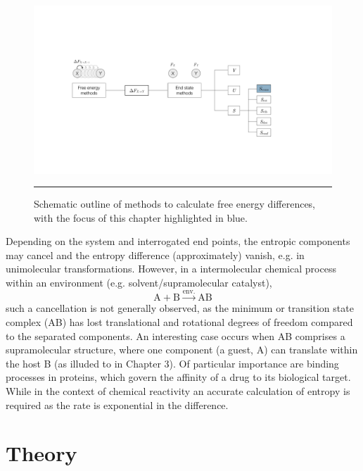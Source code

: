 \documentclass[../main.tex]{subfiles}
\begin{document}
\begin{figure}[h!]
	\centering
	\includegraphics[width=14.5cm]{4/figs/figXA_intro/figXA_intro}
	\vspace{0.4cm}
	\hrule
	\caption{Schematic outline of methods to calculate free energy differences, with the focus of this chapter highlighted in blue.}
	\label{fig::entropy_XA_intro}
\end{figure}


Depending on the system and interrogated end points, the entropic components may cancel and the entropy difference (approximately) vanish, e.g. in unimolecular transformations. However, in a intermolecular chemical process within an environment (e.g. solvent/supramolecular catalyst),
\begin{equation}
\text{A} + \text{B} \xrightarrow{\text{env.}} \text{AB}
\end{equation}
such a cancellation is not generally observed, as the minimum or transition state complex (AB) has lost translational and rotational degrees of freedom compared to the separated components.\cite{Jensen1999} An interesting case occurs when AB comprises a supramolecular structure, where one component (a guest, A) can translate within the host B (as illuded to in Chapter 3). Of particular importance are binding processes in proteins, which govern the affinity of a drug to its biological target.\cite{Woo2005} While in the context of chemical reactivity an accurate calculation of entropy is required as the rate is exponential in the difference.

\section{Theory}
\end{document}
